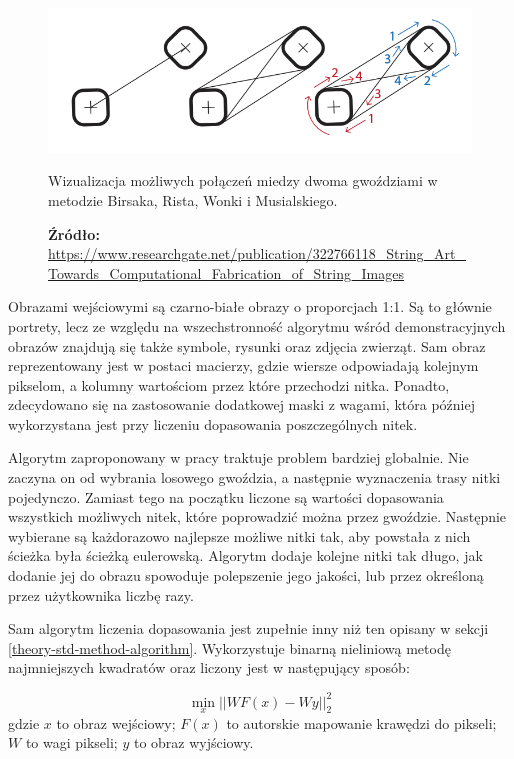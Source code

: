         \begin{figure}[htb]
            \centering
            \includegraphics[width=\textwidth,keepaspectratio]{img/3-others/birsak-edges.png}
            \caption{Wizualizacja możliwych połączeń miedzy dwoma gwoździami w metodzie Birsaka, Rista, Wonki i Musialskiego.}
            \caption*{\footnotesize{\textbf{Źródło:} {\url{https://www.researchgate.net/publication/322766118_String_Art_Towards_Computational_Fabrication_of_String_Images}}}}
            \label{birsak-edges}
        \end{figure}
    
        Obrazami wejściowymi są czarno-białe obrazy o proporcjach 1:1. Są to głównie portrety, lecz ze względu na wszechstronność algorytmu wśród demonstracyjnych obrazów znajdują się także symbole, rysunki oraz zdjęcia zwierząt. Sam obraz reprezentowany jest w postaci macierzy, gdzie wiersze odpowiadają kolejnym pikselom, a kolumny wartościom przez które przechodzi nitka. Ponadto, zdecydowano się na zastosowanie dodatkowej maski z wagami, która później wykorzystana jest przy liczeniu dopasowania poszczególnych nitek.
        
        Algorytm zaproponowany w pracy traktuje problem bardziej globalnie. Nie zaczyna on od wybrania losowego gwoździa, a następnie wyznaczenia trasy nitki pojedynczo. Zamiast tego na początku liczone są wartości dopasowania wszystkich możliwych nitek, które poprowadzić można przez gwoździe. Następnie wybierane są każdorazowo najlepsze możliwe nitki tak, aby powstała z nich ścieżka była ścieżką eulerowską. Algorytm dodaje kolejne nitki tak długo, jak dodanie jej do obrazu spowoduje polepszenie jego jakości, lub przez określoną przez użytkownika liczbę razy.
        
        Sam algorytm liczenia dopasowania jest zupełnie inny niż ten opisany w sekcji \ref{theory-std-method-algorithm}. Wykorzystuje binarną nieliniową metodę najmniejszych kwadratów oraz liczony jest w następujący sposób:
        
        \begin{equation} \label{others-birsak-penalty}
            \min_x ||WF(x) - Wy||_2^2
        \end{equation}
        gdzie \(x\) to obraz wejściowy; \(F(x)\) to autorskie mapowanie krawędzi do pikseli; \(W\) to wagi pikseli; \(y\) to obraz wyjściowy.
        
